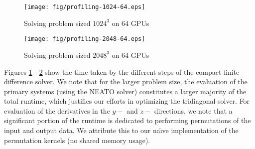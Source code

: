 \begin{figure}[h!]
\begin{center}
\texttt{[image: fig/profiling-1024-64.eps]}
\caption{Solving problem sized $1024^3$ on 64 GPUs}
\label{fig:compact-profiling-1024-64}
\end{center}
\end{figure}
%
\begin{figure}[h!]
\begin{center}
\texttt{[image: fig/profiling-2048-64.eps]}
\caption{Solving problem sized $2048^3$ on 64 GPUs}
\label{fig:compact-profiling-2048-64}
\end{center}
\end{figure}
%
Figures \ref{fig:compact-profiling-1024-64} - \ref{fig:compact-profiling-2048-64}
show the time taken by the different steps of
the compact finite difference solver.
We note that for the larger problem size,
the evaluation of the primary systems (using the NEATO solver)
constitutes a larger majority of the total runtime,
which justifies our efforts in optimizing the tridiagonal solver.
For evaluation of the derivatives in the $y-$ and $z-$ directions,
we note that a significant portion of the runtime is dedicated
to performing permutations of the input and output data.
We attribute this to our na\"{\i}ve implementation of the
permutation kernels (no shared memory usage).

